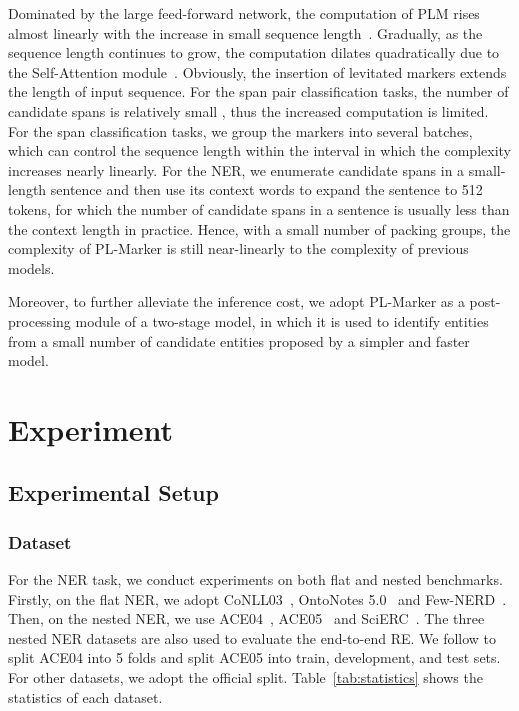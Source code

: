 \documentclass[11pt]{article}
\newcommand\Ourmodel{PL-Marker\xspace}
\begin{document}
Dominated by the large feed-forward network, the computation of PLM rises almost linearly with the increase in small sequence length~\cite{Funnel-Transformer,TR-BERT}. Gradually, as the sequence length continues to grow, the computation dilates quadratically due to the Self-Attention module~\cite{Transformer}. 
Obviously, the insertion of levitated markers extends the length of input sequence. 
For the span pair classification tasks, the number of candidate spans is relatively small , thus the increased computation is limited. 
For the span classification tasks,  we group the markers into several batches, which can control the sequence length within the interval in which the complexity increases nearly linearly. For the NER, we enumerate candidate spans in a small-length sentence and then use its context words to expand the sentence to 512 tokens, for which the number of candidate spans in a sentence is usually less than the context length in practice. Hence, with a small number of packing groups, the complexity of \Ourmodel is still near-linearly to the complexity of previous models. 


Moreover, to further alleviate the inference cost, we adopt \Ourmodel as a post-processing module of a two-stage model, in which it is used to identify entities from a small number of candidate entities proposed by a simpler and faster model.  





\section{Experiment}



\subsection{Experimental Setup}




\subsubsection{Dataset}
For the NER task, we conduct experiments on both flat and nested  benchmarks. Firstly, on the flat NER, we adopt CoNLL03~\cite{conll03},  OntoNotes 5.0~\cite{Ontonotes} and Few-NERD~\cite{Fewnerd}. Then, on the nested NER,  we use ACE04~\cite{ACE04}, ACE05~\cite{ACE05} and SciERC~\cite{SciERC}. The three nested NER datasets are also used to evaluate the end-to-end RE. 
We follow \citet{DyGIE} to split ACE04 into 5 folds and split ACE05 into train, development, and test sets. For other datasets, we adopt the official split. 
 Table~\ref{tab:statistics} shows the statistics of each dataset. 
\end{document}
